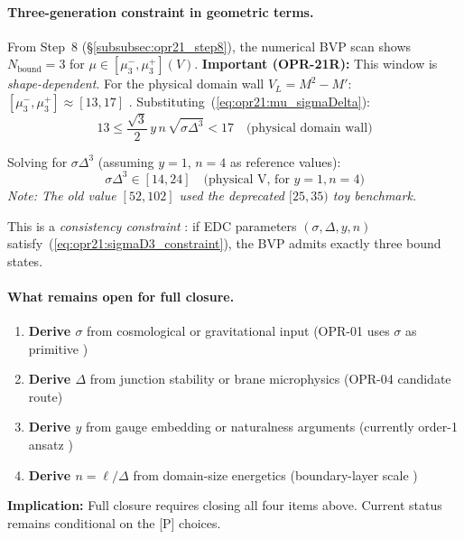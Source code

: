 \paragraph{Three-generation constraint in geometric terms.}
From Step~8 (\S\ref{subsubsec:opr21_step8}), the numerical BVP scan shows
$N_{\text{bound}} = 3$ for $\mu \in [\mu_3^-, \mu_3^+](V)$.
\textbf{Important (OPR-21R):} This window is \emph{shape-dependent}.
For the physical domain wall $V_L = M^2 - M'$: $[\mu_3^-, \mu_3^+] \approx [13, 17]$ \tagDc{}.
Substituting~(\ref{eq:opr21:mu_sigmaDelta}):
\begin{equation}
    13 \leq \frac{\sqrt{3}}{2}\, y \, n \, \sqrt{\sigma \Delta^3} < 17
    \quad \text{(physical domain wall)}
    \label{eq:opr21:Nbound3_geometric}
\end{equation}

Solving for $\sigma \Delta^3$ (assuming $y = 1$, $n = 4$ as reference values):
\begin{equation}
    \boxed{\sigma \Delta^3 \in [14, 24] \quad \text{(physical V, for } y=1, n=4 \text{)}}
    \label{eq:opr21:sigmaD3_constraint}
\end{equation}
\emph{Note: The old value $[52, 102]$ used the deprecated $[25, 35)$ toy benchmark.}

This is a \emph{consistency constraint} \tagDc{}: if EDC parameters $(\sigma, \Delta, y, n)$
satisfy~(\ref{eq:opr21:sigmaD3_constraint}), the BVP admits exactly three bound states.

\paragraph{What remains open for full closure.}
\begin{tcolorbox}[breakable, enhanced, colback=red!5!white, colframe=red!50!black,
    title=\textbf{Remaining Open Items (after OPR-01)}, width=\linewidth]
\begin{enumerate}[nosep]
    \item \textbf{Derive $\sigma$} from cosmological or gravitational input
          (OPR-01 uses $\sigma$ as primitive \tagP{})
    \item \textbf{Derive $\Delta$} from junction stability or brane microphysics
          (OPR-04 candidate route)
    \item \textbf{Derive $y$} from gauge embedding or naturalness arguments
          (currently order-1 ansatz \tagP{})
    \item \textbf{Derive $n = \ell/\Delta$} from domain-size energetics
          (boundary-layer scale \tagP{})
\end{enumerate}
\textbf{Implication:} Full \tagDer{} closure requires closing all four items above.
Current status remains \tagDc{} conditional on the [P] choices.
\end{tcolorbox}

